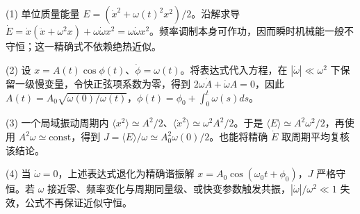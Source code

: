 (1) 单位质量能量 $E=(\dot x^2+\omega(t)^2x^2)/2$。沿解求导 $\dot E=\dot x(\ddot x+\omega^2x)+\omega\dot\omega x^2=\omega\dot\omega x^2$。频率调制本身可作功，因而瞬时机械能一般不守恒；这一精确式不依赖绝热近似。

(2) 设 $x=A(t)\cos\phi(t)$、$\dot\phi=\omega(t)$。将表达式代入方程，在 $|\dot\omega|\ll\omega^2$ 下保留一级慢变量，令快正弦项系数为零，得到 $2\omega\dot A+\dot\omega A=0$，因此 $A(t)=A_0\sqrt{\omega(0)/\omega(t)}$，$\phi(t)=\phi_0+\int_0^t\omega(s)ds$。

(3) 一个局域振动周期内 $\langle x^2\rangle\simeq A^2/2$、$\langle\dot x^2\rangle\simeq\omega^2 A^2/2$。于是 $\langle E\rangle\simeq A^2\omega^2/2$，再使用 $A^2\omega\simeq\mathrm{const}$，得到 $J=\langle E\rangle/\omega\simeq A_0^2\omega(0)/2$。也能将精确 $\dot E$ 取周期平均复核该结论。

(4) 当 $\dot\omega=0$，上述表达式退化为精确谐振解 $x=A_0\cos(\omega_0t+\phi_0)$，$J$ 严格守恒。若 $\omega$ 接近零、频率变化与周期同量级、或快变参数触发共振，$|\dot\omega|/\omega^2\ll1$ 失效，公式不再保证近似守恒。
